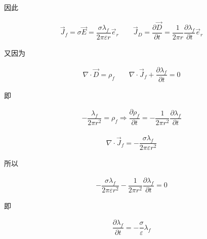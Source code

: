 \documentclass{article}
\newcommand*{\Jmath}{J}
\begin{document}
因此

\begin{equation}
  \label{eq:a1141}
  \begin{aligned}
    \vec{\Jmath}_f = \sigma \vec{E} = \dfrac{\sigma \lambda_f}{2 \pi \varepsilon r} \vec{e}_r 
    \quad\quad
    \vec{\Jmath}_D = \dfrac{\partial \vec{D}}{\partial t} = \dfrac{1}{2 \pi r} \dfrac{\partial \lambda_f}{\partial t} \vec{e}_r  
  \end{aligned}
\end{equation}

又因为

\begin{equation*}
  \begin{aligned}
    \nabla \cdot \vec{D} = \rho_f
    \quad\quad
    \nabla \cdot \vec{\Jmath}_f + \dfrac{\partial \lambda_f}{\partial t} = 0 
  \end{aligned}
\end{equation*}

即

\begin{equation*}
  \begin{aligned}
    - \dfrac{\lambda_f}{2 \pi r^2} = \rho_f
    \Rightarrow
    \dfrac{\partial \rho_f}{\partial t} = - \dfrac{1}{2 \pi r^2} \dfrac{\partial \lambda_f}{\partial t}   
  \end{aligned}
\end{equation*}

\begin{equation*}
  \begin{aligned}
    \nabla \cdot \vec{\Jmath}_f = - \dfrac{\sigma \lambda_f}{2 \pi \varepsilon r^2} 
  \end{aligned}
\end{equation*}

所以

\begin{equation*}
  \begin{aligned}
    - \dfrac{\sigma \lambda_f}{2 \pi \varepsilon r^2} - \dfrac{1}{2 \pi r^2} \dfrac{\partial \lambda_f}{\partial t} = 0 
  \end{aligned}
\end{equation*}

即

\begin{equation*}
  \begin{aligned}
    \dfrac{\partial \lambda_f}{\partial t} = - \dfrac{\sigma}{\varepsilon} \lambda_f  
  \end{aligned}
\end{equation*}
\end{document}
